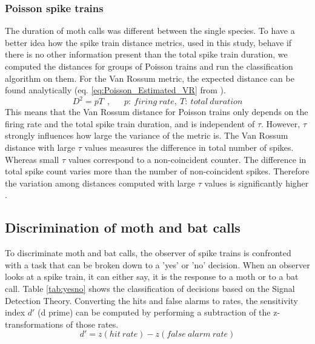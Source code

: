 \documentclass[12pt,a4paper]{article}
\begin{document}
\subsubsection{Poisson spike trains}
The duration of moth calls was different between the single species. To have a better idea how the spike train distance metrics, used in this study, behave if there is no other information present than the total spike train duration, we computed the distances for groups of Poisson trains and run the classification algorithm on them.
For the Van Rossum metric, the expected distance can be found analytically (eq. \ref{eq:Poisson_Estimated_VR} from \parencite{vanrossum_novel_2001}). 
\begin{equation}
\label{eq:Poisson_Estimated_VR}
D^{2} = pT~~,~~~~~~~p:~firing~rate,~T:~total~duration
\end{equation}
This means that the Van Rossum distance for Poisson trains only depends on the firing rate and the total spike train duration, and is independent of $ \tau $. However, $ \tau $ strongly influences how large the variance of the metric is. The Van Rossum distance with large $ \tau $ values measures the difference in total number of spikes. Whereas small $ \tau $ values correspond to  a non-coincident counter. The difference in total spike count varies more than the number of non-coincident spikes. Therefore the variation among distances computed with large $ \tau $ values is significantly higher \parencite{vanrossum_novel_2001}. 

\subsection{Discrimination of moth and bat calls}
\label{MvsBMethods}
To discriminate moth and bat calls, the observer of spike trains is confronted with a task that can be broken down to a 'yes' or 'no' decision. When an observer looks at a spike train, it can either say, it is the response to a moth or to a bat call. Table \ref{tab:yesno} shows the classification of decisions based on the Signal Detection Theory. Converting the hits and false alarms to rates, the sensitivity index $d'$ (d prime) can be computed by performing a subtraction of the z-transformations of those rates.
\begin{equation}
\label{eq:dprime}
d' = z(hit~rate) - z(false~alarm~rate)
\end{equation}
\end{document}
